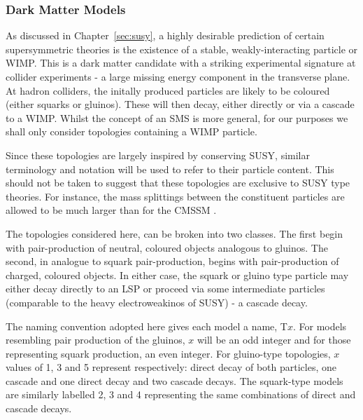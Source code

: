 
\subsubsection{Dark Matter Models}
As discussed in Chapter~\ref{sec:susy}, a highly desirable prediction of certain
supersymmetric theories is the existence of a stable, weakly-interacting
particle or \ac{WIMP}. This is a dark matter candidate with a striking
experimental signature at collider experiments - a large missing energy
component in the transverse plane. At hadron colliders, the initally produced
particles are likely to be coloured (either squarks or gluinos). These will then
decay, either directly or via a cascade to a \ac{WIMP}. Whilst the concept of an
\ac{SMS} is more general, for our purposes we shall only consider topologies
containing a \ac{WIMP} particle.

Since these topologies are largely inspired by \Rparity conserving \ac{SUSY},
similar terminology and notation will be used to refer to their particle
content. This should not be taken to suggest that these topologies are exclusive
to \ac{SUSY} type theories. For instance, the mass splittings between the
constituent particles are allowed to be much larger than for the \ac{CMSSM}
\cite{interpretation_pas}.

The topologies considered here, can be broken into two classes. The first begin
with pair-production of neutral, coloured objects analogous to gluinos. The
second, in analogue to squark pair-production, begins with pair-production of
charged, coloured objects. In either case, the squark or gluino type particle
may either decay directly to an \ac{LSP} or proceed via some intermediate
particles (comparable to the heavy electroweakinos of \ac{SUSY}) - a cascade
decay.

The naming convention adopted here gives each model a name, T$x$. For models
resembling pair production of the gluinos, $x$ will be an odd integer and for
those representing squark production, an even integer. For gluino-type
topologies, $x$ values of 1, 3 and 5 represent respectively: direct decay of
both particles, one cascade and one direct decay and two cascade decays. The
squark-type models are similarly labelled 2, 3 and 4 representing the same
combinations of direct and cascade decays.

